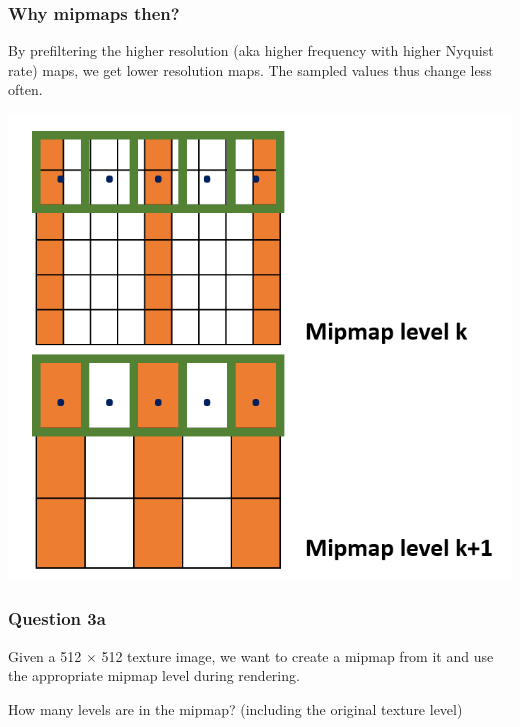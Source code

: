 \documentclass{beamer}
\begin{document}
\begin{frame}
    \frametitle{Why mipmaps then?}

    By prefiltering the higher resolution (aka higher frequency with higher Nyquist rate) maps,
    we get lower resolution maps. The sampled values thus change less often.

    \begin{center}
        \includegraphics[scale=0.3]{images/mipmaps.png}
    \end{center}

\end{frame}

\begin{frame}
    \frametitle{Question 3a}

    Given a 512 $\times$ 512 texture image, we want to create a mipmap from it and use the appropriate mipmap level 
    during rendering. 

    \vspace{1em}

    How many levels are in the mipmap? (including the original texture level)
\end{frame}
\end{document}
